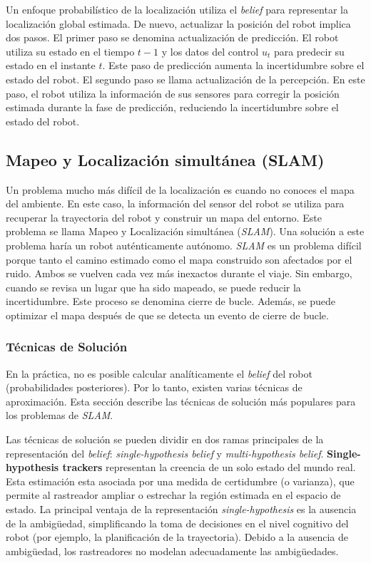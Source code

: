 Un enfoque probabilístico de la localización utiliza el \textit{belief} para representar la localización global estimada. De nuevo, actualizar la posición del robot implica dos pasos. El primer paso se denomina actualización de predicción. El robot utiliza su estado en el tiempo $t-1$ y los datos del control $u_{t}$ para predecir su estado en el instante $t$. Este paso de predicción aumenta la incertidumbre sobre el estado del robot. El segundo paso se llama actualización de la percepción. En este paso, el robot utiliza la información de sus sensores para corregir la posición estimada durante la fase de predicción, reduciendo la incertidumbre sobre el estado del robot. 
\subsection{Mapeo y Localización simultánea (SLAM)}
Un problema mucho más difícil de la localización es cuando no conoces el mapa del ambiente. En este caso, la información del sensor del robot se utiliza para recuperar la trayectoria del robot y construir un mapa del entorno.
Este problema se llama Mapeo y Localización simultánea (\textit{SLAM}). Una solución a este problema haría  un robot auténticamente autónomo. \textit{SLAM} es un problema difícil porque tanto el camino estimado como el mapa construido son afectados por el ruido. Ambos se vuelven cada vez más inexactos durante el viaje. Sin embargo, cuando se revisa un lugar que ha sido mapeado, se puede reducir la incertidumbre.
Este proceso se denomina cierre de bucle. Además, se puede optimizar el mapa después de que se detecta un evento de cierre de bucle.
\subsubsection{Técnicas de Solución}
En la práctica, no es posible calcular analíticamente el \textit{belief} del robot (probabilidades posteriores). Por lo tanto, existen varias técnicas de aproximación. Esta sección describe las técnicas de solución más populares para los problemas de \textit{SLAM}.

Las técnicas de solución se pueden dividir en dos ramas principales de la representación del \textit{belief}: \textit{single-hypothesis belief} y \textit{multi-hypothesis belief}. \textbf{Single-hypothesis trackers} representan la creencia de un solo estado del mundo real. Esta estimación esta asociada por una medida de certidumbre (o varianza), que permite al rastreador ampliar o estrechar la región estimada en el espacio de estado. La principal ventaja de la representación \textit{single-hypothesis} es la ausencia de la ambigüedad, simplificando la toma de decisiones en el nivel cognitivo del robot (por ejemplo, la planificación de la trayectoria). Debido a la ausencia de ambigüedad, los rastreadores no modelan adecuadamente las ambigüedades.

